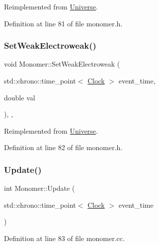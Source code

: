Reimplemented from \hyperlink{class_universe_a0f5cd04081b41ee931c0557dc397f6fb}{Universe}.



Definition at line 81 of file monomer.\+h.

\mbox{\label{class_monomer_ab887d7cfd2ecb557efb3ace59852019c}} 
\subsubsection{\texorpdfstring{Set\+Weak\+Electroweak()}{SetWeakElectroweak()}}
{\footnotesize\ttfamily void Monomer\+::\+Set\+Weak\+Electroweak (\begin{DoxyParamCaption}\item[{std\+::chrono\+::time\+\_\+point$<$ \hyperlink{universe_8h_a0ef8d951d1ca5ab3cfaf7ab4c7a6fd80}{Clock} $>$}]{event\+\_\+time,  }\item[{double}]{val }\end{DoxyParamCaption})\hspace{0.3cm}{\ttfamily [inline]}, {\ttfamily [final]}, {\ttfamily [virtual]}}



Reimplemented from \hyperlink{class_universe_a2d3d642bfdc863248e93535832fa4b00}{Universe}.



Definition at line 82 of file monomer.\+h.

\mbox{\label{class_monomer_a48dc2ffb5da8cf3dc3f4f56bba674de6}} 
\subsubsection{\texorpdfstring{Update()}{Update()}}
{\footnotesize\ttfamily int Monomer\+::\+Update (\begin{DoxyParamCaption}\item[{std\+::chrono\+::time\+\_\+point$<$ \hyperlink{universe_8h_a0ef8d951d1ca5ab3cfaf7ab4c7a6fd80}{Clock} $>$}]{event\+\_\+time }\end{DoxyParamCaption})}



Definition at line 83 of file monomer.\+cc.

